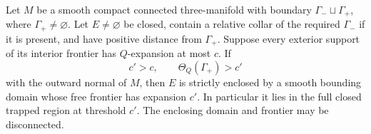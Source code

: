 \begin{lemma}
\label{lem:fl-support-enclosure}
Let \(M\) be a smooth compact connected three-manifold with boundary
\(\Gamma_-\sqcup\Gamma_+\), where \(\Gamma_+\ne\varnothing\).
Let \(E\ne\varnothing\) be closed, contain a relative collar of the
required \(\Gamma_-\) if it is present, and have positive distance from
\(\Gamma_+\).  Suppose every exterior support of its interior frontier
has \(Q\)-expansion at most \(c\).  If
\[
 c'>c,\qquad
 \Theta_Q(\Gamma_+)>c'
\]
with the outward normal of \(M\), then \(E\) is strictly enclosed by a
smooth bounding domain whose free frontier has expansion \(c'\).
In particular it lies in the full closed trapped region at threshold
\(c'\).  The enclosing domain and frontier may be disconnected.
\end{lemma}

